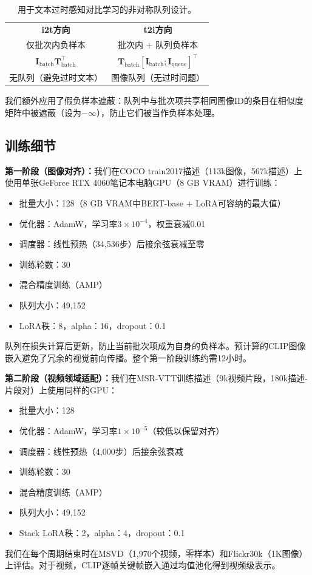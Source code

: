 \documentclass[10pt,a4paper]{ctexart}
\begin{document}
\begin{table}[h]
\centering
\caption{用于文本过时感知对比学习的非对称队列设计。}
\label{tab:queue}
\begin{tabular}{c|c}
\hline
\textbf{i2t方向} & \textbf{t2i方向} \\
仅批次内负样本 & 批次内 + 队列负样本 \\
\hline
$\mathbf{I}_{\text{batch}} \mathbf{T}_{\text{batch}}^{\top}$ & $\mathbf{T}_{\text{batch}} [\mathbf{I}_{\text{batch}}; \mathbf{I}_{\text{queue}}]^{\top}$ \\
无队列（避免过时文本） & 图像队列（无过时问题） \\
\hline
\end{tabular}
\end{table}

我们额外应用了假负样本遮蔽：队列中与批次项共享相同图像ID的条目在相似度矩阵中被遮蔽（设为$-\infty$），防止它们被当作负样本处理。

\subsection{训练细节}

\textbf{第一阶段（图像对齐）：}我们在COCO train2017描述（113k图像，567k描述）上使用单张GeForce RTX 4060笔记本电脑GPU（8 GB VRAM）进行训练：
\begin{itemize}
  \item 批量大小：128（8 GB VRAM中BERT-base + LoRA可容纳的最大值）
  \item 优化器：AdamW，学习率$3\times 10^{-4}$，权重衰减0.01
  \item 调度器：线性预热（34,536步）后接余弦衰减至零
  \item 训练轮数：30
  \item 混合精度训练（AMP）
  \item 队列大小：49,152
  \item LoRA秩：8，alpha：16，dropout：0.1
\end{itemize}
队列在损失计算后更新，防止当前批次项成为自身的负样本。预计算的CLIP图像嵌入避免了冗余的视觉前向传播。整个第一阶段训练约需12小时。

\textbf{第二阶段（视频领域适配）：}我们在MSR-VTT训练描述（9k视频片段，180k描述-片段对）上使用同样的GPU：
\begin{itemize}
  \item 批量大小：128
  \item 优化器：AdamW，学习率$1\times 10^{-5}$（较低以保留对齐）
  \item 调度器：线性预热（4,000步）后接余弦衰减
  \item 训练轮数：30
  \item 混合精度训练（AMP）
  \item 队列大小：49,152
  \item Stack LoRA秩：2，alpha：4，dropout：0.1
\end{itemize}
我们在每个周期结束时在MSVD（1,970个视频，零样本）和Flickr30k（1K图像）上评估。对于视频，CLIP逐帧关键帧嵌入通过均值池化得到视频级表示。
\end{document}
